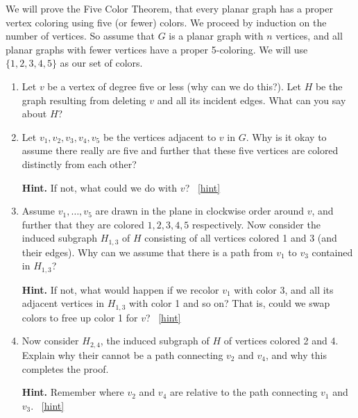 \documentclass{book}
\begin{document}
\setcounter{project}{39}
\addtocounter{project}{-1}
\begin{activity}[]\label{activity-32}
\hypertarget{p-374}{}%
We will prove the Five Color Theorem, that every planar graph has a proper vertex coloring using five (or fewer) colors.  We proceed by induction on the number of vertices.  So assume that \(G\) is a planar graph with \(n\) vertices, and all planar graphs with fewer vertices have a proper 5-coloring.  We will use \(\{1,2,3,4,5\}\) as our set of colors.%
\begin{enumerate}[font=\bfseries,label=(\alph*),ref=\alph*]
\item\label{task-51} \hypertarget{p-375}{}%
Let \(v\) be a vertex of degree five or less (why can we do this?).  Let \(H\) be the graph resulting from deleting \(v\) and all its incident edges.  What can you say about \(H\)?%
\item\label{task-52} \hypertarget{p-376}{}%
Let \(v_1, v_2, v_3, v_4, v_5\) be the vertices adjacent to \(v\) in \(G\).  Why is it okay to assume there really are five and further that these five vertices are colored distinctly from each other?%
\par\smallskip%
\noindent\textbf{Hint.}\hypertarget{hint-12}{}\quad%
\hypertarget{p-377}{}%
If not, what could we do with \(v\)?%
~\hfill{\tiny\hyperlink{a-39.b}{[hint]}\hypertarget{q-39.b}{}}\item\label{task-53} \hypertarget{p-378}{}%
Assume \(v_1, \ldots, v_5\) are drawn in the plane in clockwise order around \(v\), and further that they are colored \(1,2,3,4,5\) respectively.  Now consider the induced subgraph \(H_{1,3}\) of \(H\) consisting of all vertices colored 1 and 3 (and their edges).  Why can we assume that there is a path from \(v_1\) to \(v_3\) contained in \(H_{1,3}\)?%
\par\smallskip%
\noindent\textbf{Hint.}\hypertarget{hint-13}{}\quad%
\hypertarget{p-379}{}%
If not, what would happen if we recolor \(v_1\) with color 3, and all its adjacent vertices in \(H_{1,3}\) with color 1 and so on?  That is, could we swap colors to free up color 1 for \(v\)?%
~\hfill{\tiny\hyperlink{a-39.c}{[hint]}\hypertarget{q-39.c}{}}\item\label{task-54} \hypertarget{p-380}{}%
Now consider \(H_{2,4}\), the induced subgraph of \(H\) of vertices colored 2 and 4.  Explain why their cannot be a path connecting \(v_2\) and \(v_4\), and why this completes the proof.%
\par\smallskip%
\noindent\textbf{Hint.}\hypertarget{hint-14}{}\quad%
\hypertarget{p-381}{}%
Remember where \(v_2\) and \(v_4\) are relative to the path connecting \(v_1\) and \(v_3\).%
~\hfill{\tiny\hyperlink{a-39.d}{[hint]}\hypertarget{q-39.d}{}}\end{enumerate}
\end{activity}
\end{document}
